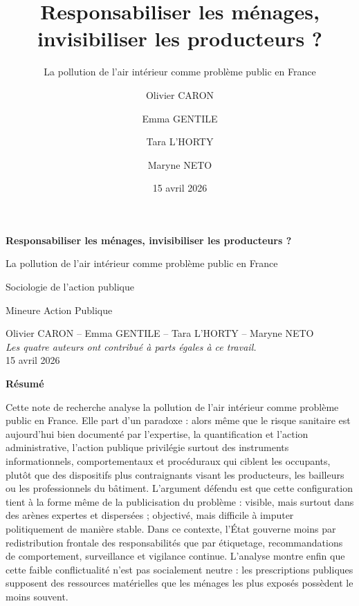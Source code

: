 \documentclass[a4paper,12pt,twoside]{book}
\title{Responsabiliser les ménages, invisibiliser les producteurs ?}
\subtitle{La pollution de l'air intérieur comme problème public en France}
\author{Olivier CARON \and Emma GENTILE \and Tara L'HORTY \and Maryne NETO}
\date{15 avril 2026}
\begin{document}
\hypersetup{pageanchor=false}
\begin{titlepage}
\thispagestyle{empty}
\begin{center}
{\Huge\bfseries Responsabiliser les ménages, invisibiliser les producteurs ?\par}
\vspace{0.35cm}
{\Large La pollution de l'air intérieur comme problème public en France\par}
\vspace{0.8cm}
{\large Sociologie de l'action publique\par}
\vspace{0.15cm}
{\normalsize Mineure Action Publique\par}
\vspace{0.8cm}
Olivier CARON \quad -- \quad Emma GENTILE \quad -- \quad Tara L'HORTY \quad -- \quad Maryne NETO\\
\vspace{0.5cm}
\textit{Les quatre auteurs ont contribué à parts égales à ce travail.}\\
\vspace{0.2cm}
15 avril 2026
\end{center}

\vspace{0.5cm}
\noindent\textbf{Résumé}\par
\smallskip
Cette note de recherche analyse la pollution de l'air intérieur comme problème public en France. Elle part d'un paradoxe : alors même que le risque sanitaire est aujourd'hui bien documenté par l'expertise, la quantification et l'action administrative, l'action publique privilégie surtout des instruments informationnels, comportementaux et procéduraux qui ciblent les occupants, plutôt que des dispositifs plus contraignants visant les producteurs, les bailleurs ou les professionnels du bâtiment. L'argument défendu est que cette configuration tient à la forme même de la publicisation du problème : visible, mais surtout dans des arènes expertes et dispersées ; objectivé, mais difficile à imputer politiquement de manière stable. Dans ce contexte, l'État gouverne moins par redistribution frontale des responsabilités que par étiquetage, recommandations de comportement, surveillance et vigilance continue. L'analyse montre enfin que cette faible conflictualité n'est pas socialement neutre : les prescriptions publiques supposent des ressources matérielles que les ménages les plus exposés possèdent le moins souvent.


\end{titlepage}
\end{document}
